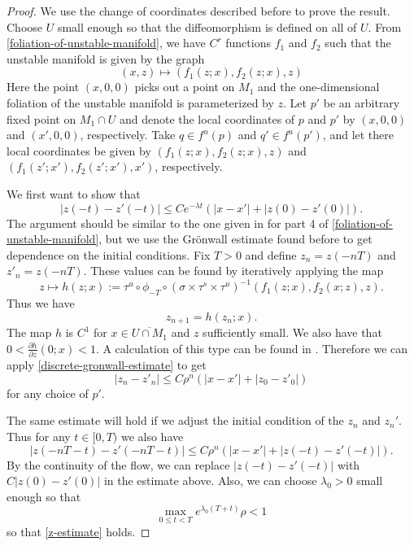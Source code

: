 \begin{proof}
	We use the change of coordinates described before to prove the result. Choose \(U\) small enough so that the diffeomorphism is defined on all of \(U\). From \cref{foliation-of-unstable-manifold}, we have \(C^r\) functions \(f_1\) and \(f_2\) such that the unstable manifold is given by the graph
	\begin{equation}
		(x,z) \mapsto (f_1(z; x),  f_2(z;x),  z)
	\end{equation}
	Here the point \((x,0,0)\) picks out a point on \( M_1\) and the one-dimensional foliation of the unstable manifold is parameterized by \(z\).
	Let \(p'\) be an arbitrary fixed point on \( M_1\cap U\) and denote the local coordinates of \(p\) and \(p'\) by \((x,0,0)\) and \((x',0,0)\), respectively. Take \(q \in f^u(p)\) and \(q' \in f^u(p')\), and let there local coordinates be given by \((f_1(z;x), f_2(z; x), z)\) and \((f_1(z';x') , f_2(z';x'), x')\), respectively. 
	
	We first want to show that 
	\begin{equation}\label{z-estimate}
		|z(-t) - z'(-t)| \leq C e^{-\lambda t} (|x- x'| + |z(0) - z'(0)|).
	\end{equation}
	The argument should be similar to the one given in \cite{wiggins1994normally} for part 4 of \cref{foliation-of-unstable-manifold}, but we use the Gr\"onwall estimate found before to get dependence on the initial conditions. Fix \(T>0\) and define \(z_n = z(-nT)\) and \(z'_{n} = z(-nT)\). These values can be found by iteratively applying the map
	\begin{equation}
		z \mapsto h(z;x) := \tau^u \circ \phi_{-T} \circ (\sigma \times \tau^s \times \tau^u)^{-1}(f_1(z;x), f_2(x;z), z).
	\end{equation}
	Thus we have 
	\begin{equation}
		z_{n+1} = h(z_{n}; x).
	\end{equation}
	The map \(h\) is \(C^1\) for \(x\in \overline {U\cap M_1}\) and \(z\) sufficiently small. We also have that \(0 < \frac{\partial h}{\partial z}(0;x) < 1\). A calculation of this type can be found in \cite{wiggins1994normally}. Therefore we can apply \cref{discrete-gronwall-estimate} to get 
	\begin{equation}
		|z_n - z'_n| \leq C \rho^n (|x-x'| + |z_0 - z'_0|)
	\end{equation}
	for any choice of \(p'\).
	
	The same estimate will hold if we adjust the initial condition of the \(z_n\) and \(z_n'\). Thus for any \(t\in [0,T)\) we also have
	\begin{equation}
		|z(-nT - t) - z'(-nT - t)| \leq C \rho^n (|x-x'| + |z(-t) - z'(-t)|).
	\end{equation}
	By the continuity of the flow, we can replace \(|z(-t) - z'(-t)|\) with \(C|z(0) - z'(0)|\) in the estimate above. Also, we can choose \(\lambda_0 > 0\) small enough so that
	\begin{equation}
		\max_{0\leq t < T} e^{\lambda_0 (T + t)} \rho < 1
	\end{equation}
	so that \cref{z-estimate} holds.
	

\end{proof}
